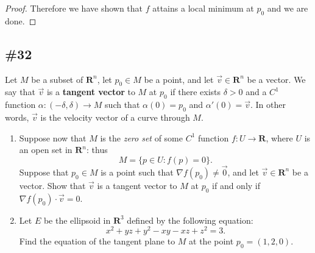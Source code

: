 \documentclass{article}
\newcommand{\R}{\mathbf{R}}
\theoremstyle{plain} %
\numberwithin{thm}{section} %
\theoremstyle{definition}
\begin{document}
\begin{proof}
            Therefore we have shown that \(f\) attains a local minimum at \(p_0\) and we are done.    
        \end{proof}
        \newpage
        \subsection{\#32}
        Let $M$ be a subset of $\R^n$, let $p_0\in M$ be a point, and let $\vec{v}\in \R^n$ be a vector. We say that $\vec{v}$ is a \textbf{tangent vector} to $M$ at $p_0$ if there exists $\delta>0$ and a $C^1$ function $\alpha:(-\delta,\delta)\rightarrow M$ such that $\alpha(0)=p_0$ and $\alpha'(0)=\vec{v}$. In other words, $\vec{v}$ is the velocity vector of a curve through $M$.

        \begin{enumerate}[label=(\alph*)]
            \item Suppose now that $M$ is the \textit{zero set} of some $C^1$ function $f:U\rightarrow \R$, where $U$ is an open set in $\R^n$: thus
                \[ M = \{p\in U : f(p)=0\}. \]
            Suppose that $p_0\in M$ is a point such that $\nabla f(p_0)\neq \vec{0}$, and let $\vec{v}\in \R^n$ be a vector. Show that $\vec{v}$ is a tangent vector to $M$ at $p_0$ if and only if $\nabla f(p_0)\cdot \vec{v}=0$.

            \item Let $E$ be the ellipsoid in $\R^3$ defined by the following equation:
                \[ x^2 + yz + y^2 - xy - xz + z^2 = 3. \]
            Find the equation of the tangent plane to $M$ at the point $p_0=(1,2,0)$.
        \end{enumerate}
\end{document}

